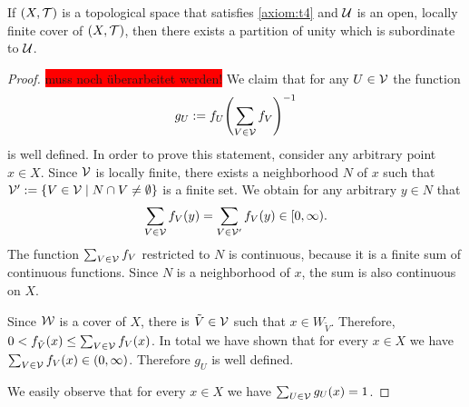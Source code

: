 \begin{lemma}
	If $\tspace$ is a topological space that satisfies \ref{axiom:t4} and $\cover$ is an open, locally finite cover of $\tspace$, then there exists a partition of unity which is subordinate to $\cover$. 
\end{lemma}
\begin{proof}
	\colorbox{red}{muss noch überarbeitet werden!}
	We claim that for any $U \in \cover[V]$ the function
	\begin{align*}
	g_U := f_U \pbraces{\sum_{V \in \cover[V]} f_V}^{-1}
	\end{align*}
	is well defined. In order to prove this statement, consider any arbitrary point $x \in X$.  Since $\cover[V]$ is locally finite, there exists a neighborhood $N$ of $x$ such that $\cover[V]^\prime := \Bbraces{V \in \cover[V] \mid N \cap V \neq \emptyset}$ is a finite set.  We obtain for any arbitrary $y \in N$ that
	\begin{align*}
	\sum_{V \in \cover[V]} f_V(y) = \sum_{V \in \cover[V]^\prime} f_V(y) \in [0, \infty).
	\end{align*}
	The function $\sum_{V \in \cover[V]} f_V$ restricted to $N$ is continuous, because it is a finite sum of continuous functions. Since $N$ is a neighborhood of $x$, the sum is also continuous on $X$.
	
	Since $\cover[W]$ is a cover of $X$, there is $\tilde{V} \in \cover[V]$ such that $x \in W_{\tilde{V}}$. Therefore, $0 < f_{\tilde{V}}(x) \leq \sum_{V \in \cover[V]} f_V(x)$. In total we have shown that for every $x \in X$ we have $\sum_{V \in \cover[V]} f_V(x) \in (0, \infty)$. Therefore $g_U$ is well defined.
	
	We easily observe that for every $x \in X$ we have $\sum_{U \in \cover[V]} g_U(x) = 1$. 
\end{proof}

